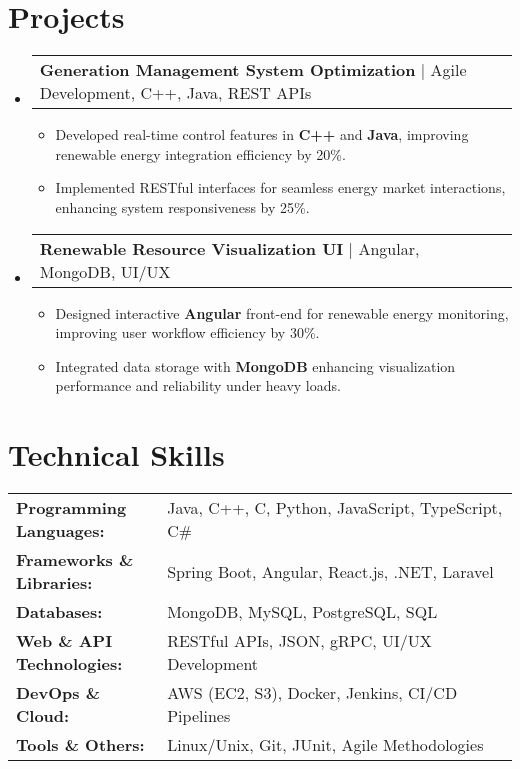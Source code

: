 \documentclass[letterpaper,11pt]{article}
\makeatletter
\newcommand{\resumeItem}[1]{
  \item\footnotesize{
    {#1 \vspace{-2pt}}
  }
}
\newcommand{\resumeProjectHeading}[2]{
    \item
    \begin{tabular*}{1.001\textwidth}{l@{\extracolsep{\fill}}r}
      \small#1 & \textbf{\small #2}\\
    \end{tabular*}\vspace{-7pt}
}
\newcommand{\resumeSubHeadingListStart}{\begin{itemize}[leftmargin=0pt, label={}]}
\newcommand{\resumeSubHeadingListEnd}{\end{itemize}}
\newcommand{\resumeItemListStart}{\begin{itemize}[leftmargin=*]}
\newcommand{\resumeItemListEnd}{\end{itemize}\vspace{-5pt}}
\makeatother
\begin{document}
\section{Projects}
    \vspace{-5pt}
    \resumeSubHeadingListStart
      \resumeProjectHeading
          {\textbf{Generation Management System Optimization} | Agile Development, C++, Java, REST APIs}{}
          \resumeItemListStart
              \resumeItem{Developed real-time control features in \textbf{C++} and \textbf{Java}, improving renewable energy integration efficiency by 20\%.}
              \resumeItem{Implemented RESTful interfaces for seamless energy market interactions, enhancing system responsiveness by 25\%.}
          \resumeItemListEnd
          \vspace{-16pt}
      \resumeProjectHeading
          {\textbf{Renewable Resource Visualization UI} | Angular, MongoDB, UI/UX}{}
          \resumeItemListStart
              \resumeItem{Designed interactive \textbf{Angular} front-end for renewable energy monitoring, improving user workflow efficiency by 30\%.}
              \resumeItem{Integrated data storage with \textbf{MongoDB} enhancing visualization performance and reliability under heavy loads.}
          \resumeItemListEnd 
    \resumeSubHeadingListEnd
\vspace{-10pt}
\section{Technical Skills}
        \vspace{-14pt}
        \begin{table}[h]
            \footnotesize
            \begin{tabular}{p{0.3\linewidth} p{0.7\linewidth}}
                \textbf{Programming Languages:} & Java, C++, C, Python, JavaScript, TypeScript, C\# \\
                \textbf{Frameworks \& Libraries:} & Spring Boot, Angular, React.js, .NET, Laravel \\
                \textbf{Databases:} & MongoDB, MySQL, PostgreSQL, SQL \\
                \textbf{Web \& API Technologies:} & RESTful APIs, JSON, gRPC, UI/UX Development \\
                \textbf{DevOps \& Cloud:} & AWS (EC2, S3), Docker, Jenkins, CI/CD Pipelines \\
                \textbf{Tools \& Others:} & Linux/Unix, Git, JUnit, Agile Methodologies \\
            \end{tabular}
        \end{table}
\end{document}
